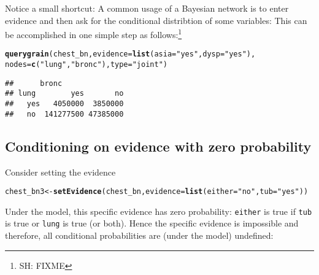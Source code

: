 \documentclass[10pt]{article}\usepackage[]{graphicx}\usepackage[]{color}
\makeatletter
\newcommand{\hlstr}[1]{\textcolor[rgb]{0.192,0.494,0.8}{#1}}%
\newcommand{\hlstd}[1]{\textcolor[rgb]{0.345,0.345,0.345}{#1}}%
\newcommand{\hlkwb}[1]{\textcolor[rgb]{0.69,0.353,0.396}{#1}}%
\newcommand{\hlkwc}[1]{\textcolor[rgb]{0.333,0.667,0.333}{#1}}%
\newcommand{\hlkwd}[1]{\textcolor[rgb]{0.737,0.353,0.396}{\textbf{#1}}}%
\newenvironment{kframe}{%
 \def\at@end@of@kframe{}%
 \ifinner\ifhmode%
  \def\at@end@of@kframe{\end{minipage}}%
  \begin{minipage}{\columnwidth}%
 \fi\fi%
 \def\FrameCommand##1{\hskip\@totalleftmargin \hskip-\fboxsep
 \colorbox{shadecolor}{##1}\hskip-\fboxsep
     \hskip-\linewidth \hskip-\@totalleftmargin \hskip\columnwidth}%
 \MakeFramed {\advance\hsize-\width
   \@totalleftmargin\z@ \linewidth\hsize
   \@setminipage}}%
 {\par\unskip\endMakeFramed%
 \at@end@of@kframe}
\newenvironment{knitrout}{}{} %
\makeatother
\begin{document}
Notice a small shortcut: A common usage of a Bayesian network is to
enter evidence and then ask for the conditional distribtion of some
variables: This can be accomplished in one simple step as follows:\footnote{SH: FIXME}
\begin{knitrout}
\color{fgcolor}\begin{kframe}
\begin{alltt}
\hlkwd{querygrain}\hlstd{(chest_bn,} \hlkwc{evidence}\hlstd{=}\hlkwd{list}\hlstd{(}\hlkwc{asia}\hlstd{=}\hlstr{"yes"}\hlstd{,} \hlkwc{dysp}\hlstd{=}\hlstr{"yes"}\hlstd{),}
           \hlkwc{nodes}\hlstd{=}\hlkwd{c}\hlstd{(}\hlstr{"lung"}\hlstd{,} \hlstr{"bronc"}\hlstd{),} \hlkwc{type}\hlstd{=}\hlstr{"joint"}\hlstd{)}
\end{alltt}
\begin{verbatim}
##      bronc
## lung        yes       no
##   yes   4050000  3850000
##   no  141277500 47385000
\end{verbatim}
\end{kframe}
\end{knitrout}



\subsection{Conditioning on evidence with zero probability}
\label{sec:zero-probabilities}

Consider setting the evidence
\begin{knitrout}
\color{fgcolor}\begin{kframe}
\begin{alltt}
\hlstd{chest_bn3} \hlkwb{<-} \hlkwd{setEvidence}\hlstd{(chest_bn,} \hlkwc{evidence}\hlstd{=}\hlkwd{list}\hlstd{(}\hlkwc{either}\hlstd{=}\hlstr{"no"}\hlstd{,} \hlkwc{tub}\hlstd{=}\hlstr{"yes"}\hlstd{))}
\end{alltt}
\end{kframe}
\end{knitrout}

Under the model, this specific evidence has zero probability:
\verb|either| is true if \verb|tub| is true or \verb|lung| is true (or
both). Hence the specific evidence is impossible and therefore, all
conditional probabilities are (under the model) undefined:
\end{document}
